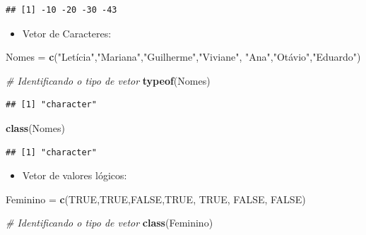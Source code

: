 \documentclass[
]{book}
\newenvironment{Shaded}{\begin{snugshade}}{\end{snugshade}}
\newcommand{\CommentTok}[1]{\textcolor[rgb]{0.56,0.35,0.01}{\textit{#1}}}
\newcommand{\ConstantTok}[1]{\textcolor[rgb]{0.56,0.35,0.01}{#1}}
\newcommand{\FunctionTok}[1]{\textcolor[rgb]{0.13,0.29,0.53}{\textbf{#1}}}
\newcommand{\NormalTok}[1]{#1}
\newcommand{\OtherTok}[1]{\textcolor[rgb]{0.56,0.35,0.01}{#1}}
\newcommand{\StringTok}[1]{\textcolor[rgb]{0.31,0.60,0.02}{#1}}
\providecommand{\tightlist}{%
  \setlength{\itemsep}{0pt}\setlength{\parskip}{0pt}}
\begin{document}
\begin{verbatim}
## [1] -10 -20 -30 -43
\end{verbatim}

\begin{itemize}
\tightlist
\item
  Vetor de Caracteres:
\end{itemize}

\begin{Shaded}
\begin{Highlighting}[]
\NormalTok{Nomes }\OtherTok{=} \FunctionTok{c}\NormalTok{(}\StringTok{"Letícia"}\NormalTok{,}\StringTok{"Mariana"}\NormalTok{,}\StringTok{"Guilherme"}\NormalTok{,}\StringTok{"Viviane"}\NormalTok{,}
          \StringTok{"Ana"}\NormalTok{,}\StringTok{"Otávio"}\NormalTok{,}\StringTok{"Eduardo"}\NormalTok{)}


\CommentTok{\# Identificando o tipo de vetor}
\FunctionTok{typeof}\NormalTok{(Nomes)}
\end{Highlighting}
\end{Shaded}

\begin{verbatim}
## [1] "character"
\end{verbatim}

\begin{Shaded}
\begin{Highlighting}[]
\FunctionTok{class}\NormalTok{(Nomes)}
\end{Highlighting}
\end{Shaded}

\begin{verbatim}
## [1] "character"
\end{verbatim}

\begin{itemize}
\tightlist
\item
  Vetor de valores lógicos:
\end{itemize}

\begin{Shaded}
\begin{Highlighting}[]
\NormalTok{Feminino }\OtherTok{=} \FunctionTok{c}\NormalTok{(}\ConstantTok{TRUE}\NormalTok{,}\ConstantTok{TRUE}\NormalTok{,}\ConstantTok{FALSE}\NormalTok{,}\ConstantTok{TRUE}\NormalTok{, }\ConstantTok{TRUE}\NormalTok{, }\ConstantTok{FALSE}\NormalTok{, }\ConstantTok{FALSE}\NormalTok{)}

\CommentTok{\# Identificando o tipo de vetor}
\FunctionTok{class}\NormalTok{(Feminino)}
\end{Highlighting}
\end{Shaded}
\end{document}
